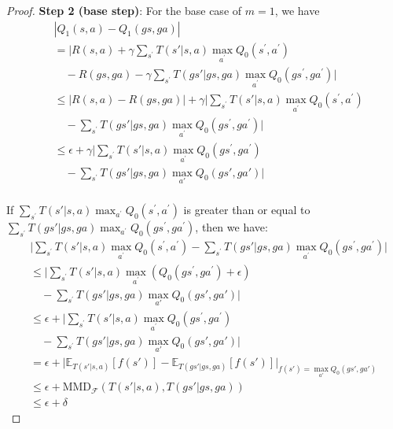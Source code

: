 \documentclass[letterpaper]{article} %
\theoremstyle{definition}
\begin{document}
\begin{proof}
\textbf{Step 2 (base step)}: For the base case of $m=1$, we have
{\scriptsize
\begin{equation*}
\begin{aligned} 
& \left|Q_1(s, a) - Q_1(gs, ga)\right| \\
& = \Biggl |R(s, a) + \gamma \sum_{s^{\prime}} T(s'|s, a)  \max_{a^{\prime}} Q_0(s^{\prime}, a^{\prime}) \\
& \quad - R(gs, ga) - \gamma \sum_{s^{\prime}} T(gs'|gs, ga)  \max_{a^{\prime}} Q_0(gs^{\prime}, ga^{\prime}) \Biggl | \\
& \leq \Biggl |R(s, a)- R(gs, ga) \Biggl | + \gamma \Biggl |\sum_{s^{\prime}} T(s'|s, a)  \max_{a^{\prime}} Q_0(s^{\prime}, a^{\prime}) \\
& \quad  -  \sum_{s^{\prime}} T(gs'|gs, ga)  \max_{a^{\prime}} Q_0(gs^{\prime}, ga^{\prime}) \Biggl | \\
& \leq \epsilon + \gamma \Biggl |\sum_{s^{\prime}} T(s'|s, a)  \max_{a^{\prime}} Q_0(gs^{\prime}, ga^{\prime}) \\
& \quad - \sum_{s^{\prime}}  T(gs'|gs, ga) \max_{a'} Q_0(gs', ga')\Biggl | \\
\end{aligned}
\end{equation*}}

If $\sum_{s^{\prime}} T(s'|s, a)  \max_{a^{\prime}} Q_0(s^{\prime}, a^{\prime})$  is greater than or equal to $\sum_{s^{\prime}} T(gs'|gs, ga)  \max_{a^{\prime}} Q_0(gs^{\prime}, ga^{\prime})$, then we have:
{\scriptsize
\begin{equation*}
\begin{aligned}
&   \Biggl |\sum_{s^{\prime}} T(s'|s, a)  \max_{a^{\prime}} Q_0(s^{\prime}, a^{\prime})  -  \sum_{s^{\prime}} T(gs'|gs, ga)  \max_{a^{\prime}} Q_0(gs^{\prime}, ga^{\prime}) \Biggl | \\
& \leq \Biggl |\sum_{s^{\prime}} T(s'|s, a)  \max_{a^{\prime}} (Q_0(gs^{\prime}, ga^{\prime})+\epsilon) \\
& \quad - \sum_{s^{\prime}}  T(gs'|gs, ga) \max_{a'} Q_0(gs', ga')\Biggl | \\
& \leq \epsilon  + \Biggl |\sum_{s^{\prime}} T(s'|s, a)  \max_{a^{\prime}} Q_0(gs^{\prime}, ga^{\prime}) \\
& \quad - \sum_{s^{\prime}}  T(gs'|gs, ga) \max_{a'} Q_0(gs', ga')\Biggl | \\
& = \epsilon + \Biggl | \mathbb{E}_{T(s'|s, a)}[f(s')] - \mathbb{E}_{T(gs'|gs, ga)}[f(s')] \Biggl |_{f(s')=\max_{a'} Q_0(gs', ga')}\\
& \leq \epsilon + \text{MMD}_{\mathcal{F}} \left(T(s'|s, a), T(gs'|gs, ga)\right) \\
& \leq \epsilon + \delta
\end{aligned}
\end{equation*}}


\end{proof}
\end{document}
